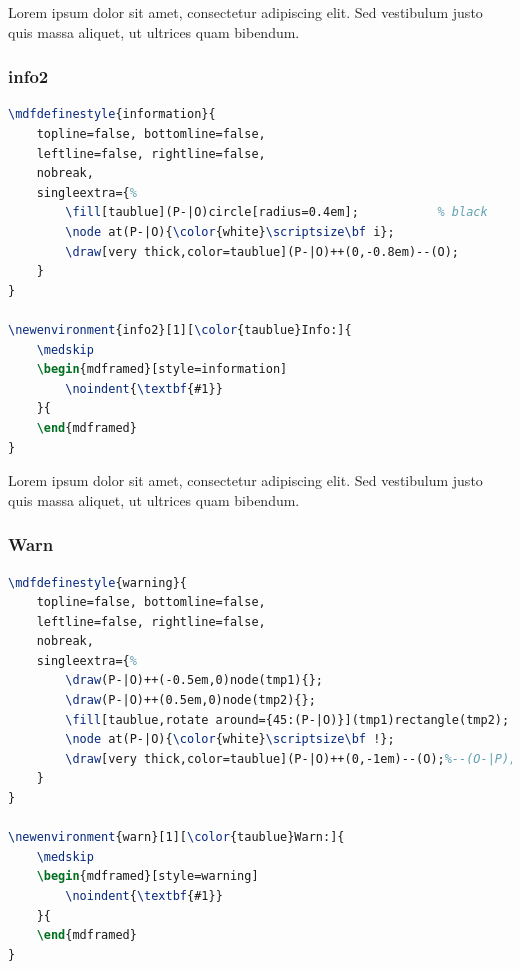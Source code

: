 \documentclass[10pt,a4paper,twoside]{tau-book}
\begin{document}
			\begin{info}
                    Lorem ipsum dolor sit amet, consectetur adipiscing elit. Sed vestibulum justo quis massa aliquet, ut ultrices quam bibendum.
			\end{info}
			
		\subsubsection{info2}
		
			\begin{lstlisting}[language=TeX, caption=Info2 environment code.]
\mdfdefinestyle{information}{
	topline=false, bottomline=false,
	leftline=false, rightline=false,
	nobreak,
	singleextra={%
		\fill[taublue](P-|O)circle[radius=0.4em];			% black
		\node at(P-|O){\color{white}\scriptsize\bf i};
		\draw[very thick,color=taublue](P-|O)++(0,-0.8em)--(O);
	}
}

\newenvironment{info2}[1][\color{taublue}Info:]{
	\medskip
	\begin{mdframed}[style=information]
		\noindent{\textbf{#1}}
	}{
	\end{mdframed}
} \end{lstlisting}
			
			\begin{info2}    
                    Lorem ipsum dolor sit amet, consectetur adipiscing elit. Sed vestibulum justo quis massa aliquet, ut ultrices quam bibendum.
			\end{info2}
			
		\subsubsection{Warn}
		
			\begin{lstlisting}[language=TeX, caption=Warn environment code.]
\mdfdefinestyle{warning}{
	topline=false, bottomline=false,
	leftline=false, rightline=false,
	nobreak,
	singleextra={%
		\draw(P-|O)++(-0.5em,0)node(tmp1){};
		\draw(P-|O)++(0.5em,0)node(tmp2){};
		\fill[taublue,rotate around={45:(P-|O)}](tmp1)rectangle(tmp2);
		\node at(P-|O){\color{white}\scriptsize\bf !};
		\draw[very thick,color=taublue](P-|O)++(0,-1em)--(O);%--(O-|P);
	}
}

\newenvironment{warn}[1][\color{taublue}Warn:]{
	\medskip
	\begin{mdframed}[style=warning]
		\noindent{\textbf{#1}}
	}{
	\end{mdframed}
} \end{lstlisting}
\end{document}
